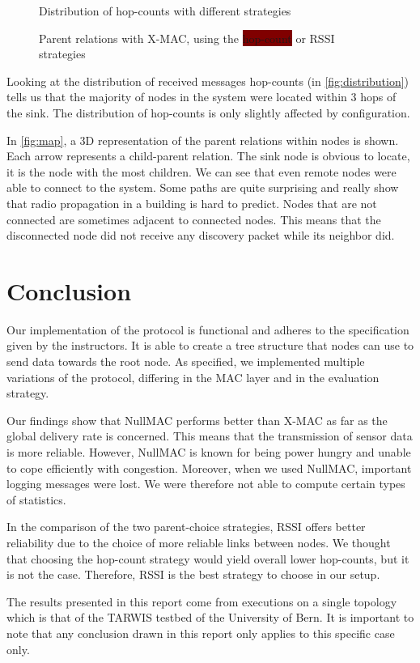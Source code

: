 \documentclass[a4paper]{llncs}
\begin{document}
\begin{figure}[htb]
	\centering
	
	\caption{Distribution of hop-counts with different strategies}
	\label{fig:distribution}
\end{figure}

\begin{figure}[tp]
	\centering
	
	\caption{Parent relations with X-MAC, using the \colorbox{Maroon}{\color{white}hop-count} or \colorbox{JungleGreen}{RSSI} strategies}
	\label{fig:map}
\end{figure}

Looking at the distribution of received messages hop-counts (in \autoref{fig:distribution}) tells us that the majority of nodes in the system were located within 3 hops of the sink.
The distribution of hop-counts is only slightly affected by configuration.

In \autoref{fig:map}, a 3D representation of the parent relations within nodes is shown.
Each arrow represents a child-parent relation.
The sink node is obvious to locate, it is the node with the most children.
We can see that even remote nodes were able to connect to the system.
Some paths are quite surprising and really show that radio propagation in a building is hard to predict.
Nodes that are not connected are sometimes adjacent to connected nodes.
This means that the disconnected node did not receive any discovery packet while its neighbor did.

\section{Conclusion}

Our implementation of the protocol is functional and adheres to the specification given by the instructors.
It is able to create a tree structure that nodes can use to send data towards the root node.
As specified, we implemented multiple variations of the protocol, differing in the MAC layer and in the evaluation strategy.

Our findings show that NullMAC performs better than X-MAC as far as the global delivery rate is concerned.
This means that the transmission of sensor data is more reliable.
However, NullMAC is known for being power hungry and unable to cope efficiently with congestion.
Moreover, when we used NullMAC, important logging messages were lost.
We were therefore not able to compute certain types of statistics.

In the comparison of the two parent-choice strategies, RSSI offers better reliability due to the choice of more reliable links between nodes.
We thought that choosing the hop-count strategy would yield overall lower hop-counts, but it is not the case.
Therefore, RSSI is the best strategy to choose in our setup.

The results presented in this report come from executions on a single topology which is that of the TARWIS testbed of the University of Bern.
It is important to note that any conclusion drawn in this report only applies to this specific case only.

\printbibliography
\end{document}
